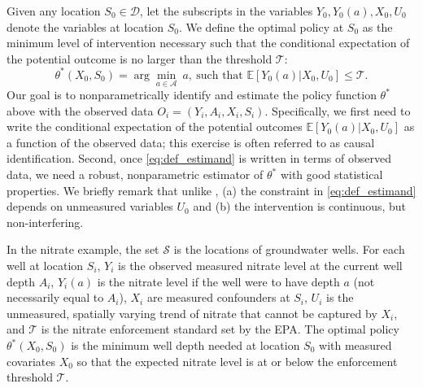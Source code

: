 \documentclass[12pt]{article}
\newcommand{\E}{\mathbb{E}}
\newcommand{\CP}[1]{{\color{purple}From Chan: #1}}
\newcommand{\XL}[1]{{\color{blue}from Xindi: #1}}
\begin{document}
 Given any location $S_0\in\mathcal{D}$, let the subscripts in the variables $Y_0, Y_0(a),X_0,U_0$ denote the variables at location $S_0$. We define the optimal policy at $S_0$ as the minimum level of intervention necessary such that the conditional expectation of the potential outcome is no larger than the threshold $\mathcal{T}$:
\begin{equation}\label{eq:def_estimand}
    \theta^*(X_0,S_0) = \arg\min_{a\in\mathcal{A}} \ a, \ \text{such that } \E[Y_0(a)| X_0, U_0]\leq \mathcal{T}.
\end{equation}
\noindent Our goal is to nonparametrically identify and estimate the policy function $\theta^*$ above with the observed data $O_i = (Y_i, A_i,X_i, S_i)$. Specifically, we first need to write the conditional expectation of the potential outcomes $\E[Y_0(a)| X_0, U_0]$ as a function of the observed data; this exercise is often referred to as causal identification. Second, once \eqref{eq:def_estimand} is written in terms of observed data, we need a robust, nonparametric estimator of $\theta^*$ with good statistical properties.  We briefly remark that unlike \citet{park2024minimum}, (a) the constraint in \eqref{eq:def_estimand} depends on unmeasured variables $U_0$ and (b) the intervention is continuous, but non-interfering. 

In the nitrate example, the set $\mathcal{S}$ is the  locations of groundwater wells. For each well at location $S_i$, $Y_i$ is the observed measured nitrate level at the current well depth $A_i$, $Y_i(a)$ is the nitrate level if the well were to have depth $a$ (not necessarily equal to $A_i$), $X_i$ are measured confounders at $S_i$,  $U_i$ is the unmeasured, spatially varying trend of nitrate that cannot be captured by $X_i$, and $\mathcal{T}$ is the nitrate enforcement standard set by the EPA. The optimal policy $\theta^*(X_0, S_0)$ is the minimum well depth needed at location $S_0$ with measured covariates $X_0$ so that the expected nitrate level is at or below the enforcement threshold $\mathcal{T}$.
\end{document}
